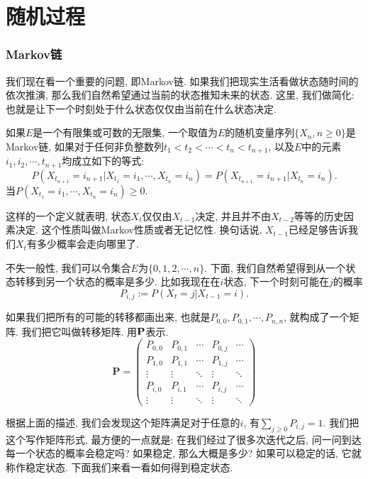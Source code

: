 \part{随机过程}


\section{Markov链}

我们现在看一个重要的问题, 即Markov链. 如果我们把现实生活看做状态随时间的依次推演, 那么我们自然希望通过当前的状态推知未来的状态. 这里, 我们做简化: 也就是让下一个时刻处于什么状态仅仅由当前在什么状态决定. 

\begin{definition}
    如果$E$是一个有限集或可数的无限集, 一个取值为$E$的随机变量序列$\{X_n,n\geq 0\}$是Markov链, 如果对于任何非负整数列$t_1< t_2< \cdots< t_{n}<t_{n+1}$, 以及$E$中的元素$i_1, i_2, \cdots , t_{n+1}$均成立如下的等式: 
    $$
    P(X_{t_{n+1}}=i_{n+1} | X_{t_1}=i_1, \cdots, X{_{t_n}}=i_n)=P(X_{t_{n+1}}=i_{n+1}|X_{t_n}=i_n).
    $$
    当$P(X_{t_1}=i_1, \cdots, X_{t_n}=i_n)\geq 0$. 
\end{definition}

这样的一个定义就表明, 状态$X_t$仅仅由$X_{t-1}$决定, 并且并不由$X_{t-2}$等等的历史因素决定. 这个性质叫做Markov性质或者无记忆性. 换句话说, $X_{t-1}$已经足够告诉我们$X_t$有多少概率会走向哪里了. 

不失一般性, 我们可以令集合$E$为$\{0,1,2,\cdots, n\}$. 下面, 我们自然希望得到从一个状态转移到另一个状态的概率是多少. 比如我现在在$i$状态, 下一个时刻可能在$j$的概率
$$
P_{i,j}:=P(X_t=j|X_{t-1}=i).
$$

如果我们把所有的可能的转移都画出来, 也就是$P_{0,0}, P_{0,1}, \cdots, P_{n,n}$, 就构成了一个矩阵. 我们把它叫做转移矩阵. 用$\bf P$表示.
$$
\mathbf{P}=\left(\begin{array}{ccccc}P_{0,0} & P_{0,1} & \cdots & P_{0, j} & \cdots \\ P_{1,0} & P_{1,1} & \cdots & P_{1, j} & \cdots \\ \vdots & \vdots & \ddots & \vdots & \ddots \\ P_{i, 0} & P_{i, 1} & \cdots & P_{i, j} & \cdots \\ \vdots & \vdots & \ddots & \vdots & \ddots\end{array}\right)
$$

根据上面的描述, 我们会发现这个矩阵满足对于任意的$i$, 有$\sum_{j\geq 0}P_{i,j}=1$. 我们把这个写作矩阵形式, 最方便的一点就是: 在我们经过了很多次迭代之后, 问一问到达每一个状态的概率会稳定吗? 如果稳定, 那么大概是多少? 如果可以稳定的话, 它就称作稳定状态. 下面我们来看一看如何得到稳定状态. 

